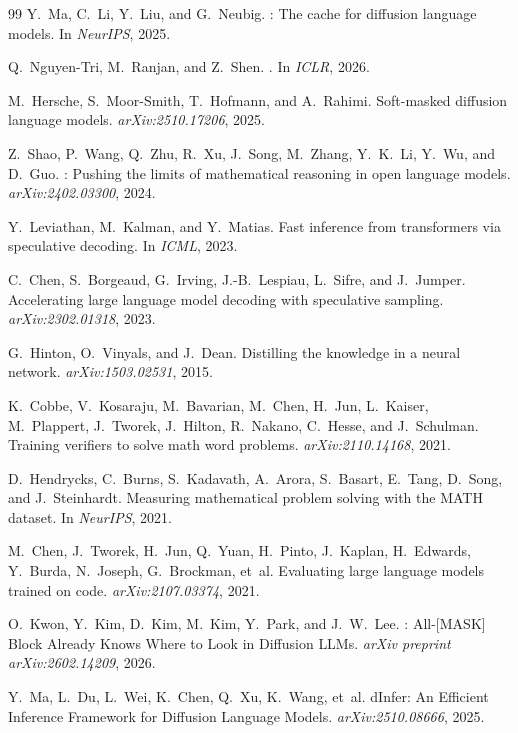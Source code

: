 \documentclass[11pt]{article}
\begin{document}
\begin{thebibliography}{99}
Y.~Ma, C.~Li, Y.~Liu, and G.~Neubig.
: The cache for diffusion language models.
\newblock In \emph{NeurIPS}, 2025.

Q.~Nguyen-Tri, M.~Ranjan, and Z.~Shen.
.
\newblock In \emph{ICLR}, 2026.

M.~Hersche, S.~Moor-Smith, T.~Hofmann, and A.~Rahimi.
\newblock Soft-masked diffusion language models.
\newblock \emph{arXiv:2510.17206}, 2025.

Z.~Shao, P.~Wang, Q.~Zhu, R.~Xu, J.~Song, M.~Zhang, Y.~K.~Li, Y.~Wu, and D.~Guo.
: Pushing the limits of mathematical reasoning in open language models.
\newblock \emph{arXiv:2402.03300}, 2024.

Y.~Leviathan, M.~Kalman, and Y.~Matias.
\newblock Fast inference from transformers via speculative decoding.
\newblock In \emph{ICML}, 2023.

C.~Chen, S.~Borgeaud, G.~Irving, J.-B.~Lespiau, L.~Sifre, and J.~Jumper.
\newblock Accelerating large language model decoding with speculative sampling.
\newblock \emph{arXiv:2302.01318}, 2023.

G.~Hinton, O.~Vinyals, and J.~Dean.
\newblock Distilling the knowledge in a neural network.
\newblock \emph{arXiv:1503.02531}, 2015.

K.~Cobbe, V.~Kosaraju, M.~Bavarian, M.~Chen, H.~Jun, L.~Kaiser, M.~Plappert, J.~Tworek, J.~Hilton, R.~Nakano, C.~Hesse, and J.~Schulman.
\newblock Training verifiers to solve math word problems.
\newblock \emph{arXiv:2110.14168}, 2021.

D.~Hendrycks, C.~Burns, S.~Kadavath, A.~Arora, S.~Basart, E.~Tang, D.~Song, and J.~Steinhardt.
\newblock Measuring mathematical problem solving with the {MATH} dataset.
\newblock In \emph{NeurIPS}, 2021.

M.~Chen, J.~Tworek, H.~Jun, Q.~Yuan, H.~Pinto, J.~Kaplan, H.~Edwards, Y.~Burda, N.~Joseph, G.~Brockman, et~al.
\newblock Evaluating large language models trained on code.
\newblock \emph{arXiv:2107.03374}, 2021.

O.~Kwon, Y.~Kim, D.~Kim, M.~Kim, Y.~Park, and J.~W.~Lee.
: {All-[MASK]} Block Already Knows Where to Look in Diffusion {LLM}s.
\newblock \emph{arXiv preprint arXiv:2602.14209}, 2026.

Y.~Ma, L.~Du, L.~Wei, K.~Chen, Q.~Xu, K.~Wang, et~al.
\newblock dInfer: An Efficient Inference Framework for Diffusion Language Models.
\newblock \emph{arXiv:2510.08666}, 2025.

\end{thebibliography}
\end{document}
